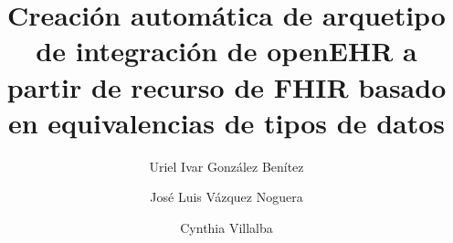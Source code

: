 \title{Creación automática de arquetipo de integración de openEHR a partir de recurso de FHIR basado en equivalencias de tipos de datos}

\author{Uriel Ivar González Benítez}

\author{José Luis Vázquez Noguera}

\author{Cynthia Villalba}
